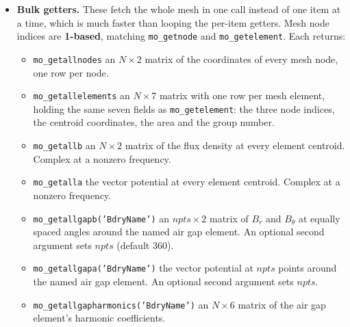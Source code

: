 \begin{itemize}
\item {\bf Bulk getters.}  These fetch the whole mesh in one call instead of one item at a time, which is much faster than looping the per-item getters.  Mesh node indices are {\bf 1-based}, matching {\tt mo\_getnode} and {\tt mo\_getelement}.  Each returns:

\begin{itemize}
\item{\tt mo\_getallnodes} an $N \times 2$ matrix of the coordinates of every mesh node, one row per node.
\item{\tt mo\_getallelements} an $N \times 7$ matrix with one row per mesh element, holding the same seven fields as {\tt mo\_getelement}: the three node indices, the centroid coordinates, the area and the group number.
\item{\tt mo\_getallb} an $N \times 2$ matrix of the flux density at every element centroid. Complex at a nonzero frequency.
\item{\tt mo\_getalla} the vector potential at every element centroid. Complex at a nonzero frequency.
\item{\tt mo\_getallgapb('BdryName')} an $npts \times 2$ matrix of $B_r$ and $B_\theta$ at equally spaced angles around the named air gap element. An optional second argument sets $npts$ (default 360).
\item{\tt mo\_getallgapa('BdryName')} the vector potential at $npts$ points around the named air gap element. An optional second argument sets $npts$.
\item{\tt mo\_getallgapharmonics('BdryName')} an $N \times 6$ matrix of the air gap element's harmonic coefficients.
\end{itemize}

\end{itemize}
